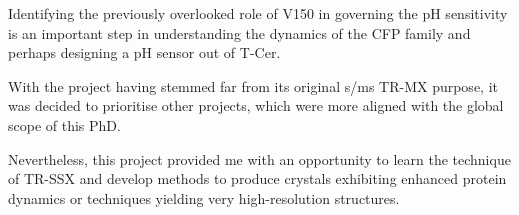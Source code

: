\vspace{2mm}

Identifying the previously overlooked role of V150 in governing the pH sensitivity is an important step in understanding the dynamics of the CFP family and perhaps designing a pH sensor out of T-Cer. 

With the project having stemmed far from its original \textmu s/ms TR-MX purpose, it was decided to prioritise other projects, which were more aligned with the global scope of this PhD. 

Nevertheless, this project provided me with an opportunity to learn the technique of TR-SSX and develop methods to produce crystals exhibiting enhanced protein dynamics or techniques yielding very high-resolution structures. 